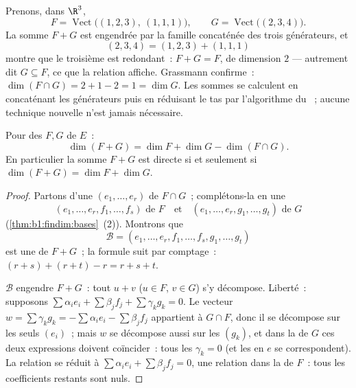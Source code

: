 \begin{example}
\label{ex:b1:findim:sumconcat}
Prenons, dans $\R^3$,
\[
F = \operatorname{Vect}\bigl((1,2,3),\ (1,1,1)\bigr),
\qquad
G = \operatorname{Vect}\bigl((2,3,4)\bigr) .
\]
La somme $F + G$ est engendrée par la famille concaténée des trois
générateurs, et
\[
(2, 3, 4) = (1, 2, 3) + (1, 1, 1)
\]
montre que le troisième est redondant~: $F + G = F$, de dimension $2$
--- autrement dit $G \subseteq F$, ce que la relation affiche.
Grassmann confirme~: $\dim(F \cap G) = 2 + 1 - 2 = 1 = \dim G$.
Les sommes se calculent en concaténant les générateurs puis en
réduisant le tas par l'algorithme du ~; aucune technique nouvelle
n'est jamais nécessaire.
\end{example}

\begin{theorem}\label{thm:b1:findim:grassmann}
Pour des  $F, G$  de
$E$~:
\[
\dim(F + G) = \dim F + \dim G - \dim(F \cap G) .
\]
En particulier la somme $F + G$ est directe si et seulement si
$\dim(F + G) = \dim F + \dim G$.
\end{theorem}

\begin{proof}
Partons d'une  $(e_1, \dots, e_r)$
de $F \cap G$~; complétons-la en une
\[
(e_1, \dots, e_r, f_1, \dots, f_s) \text{ de } F
\quad\text{et}\quad
(e_1, \dots, e_r, g_1, \dots, g_t) \text{ de } G
\]
(\cref{thm:b1:findim:bases}~(2)). Montrons que
\[
\mathcal{B} = (e_1, \dots, e_r, f_1, \dots, f_s, g_1, \dots, g_t)
\]
est une  de $F + G$~; la formule suit par comptage~: $(r + s) +
(r + t) - r = r + s + t$.

$\mathcal{B}$ engendre $F + G$~: tout $u + v$ ($u \in F$, $v \in G$)
s'y décompose. Liberté~: supposons $\sum \alpha_i e_i + \sum
\beta_j f_j + \sum \gamma_k g_k = 0$. Le vecteur $w = \sum \gamma_k
g_k = -\sum\alpha_i e_i - \sum\beta_j f_j$ appartient à $G \cap F$, donc
il se décompose sur les seuls $(e_i)$~; mais $w$ se décompose aussi
sur les $(g_k)$, et dans la  de $G$ ces deux expressions doivent
coïncider~: tous les
$\gamma_k = 0$ (et les  en $e$ se correspondent). La relation se
réduit à $\sum\alpha_i e_i + \sum\beta_j f_j = 0$, une relation dans la
 de $F$~: tous les coefficients restants sont nuls.
\end{proof}

